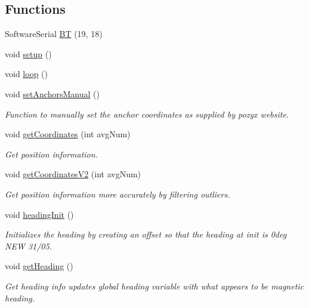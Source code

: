 \subsection*{Functions}
\begin{DoxyCompactItemize}
\item 
Software\+Serial \mbox{\hyperlink{bot_main_8ino_ace551ed442614cda896e7802f3b22163}{BT}} (19, 18)
\item 
void \mbox{\hyperlink{bot_main_8ino_a4fc01d736fe50cf5b977f755b675f11d}{setup}} ()
\item 
void \mbox{\hyperlink{bot_main_8ino_afe461d27b9c48d5921c00d521181f12f}{loop}} ()
\item 
void \mbox{\hyperlink{bot_main_8ino_ad401219e4b701bed928f7caafd7108f2}{set\+Anchors\+Manual}} ()
\begin{DoxyCompactList}\small\item\em Function to manually set the anchor coordinates as supplied by pozyx website. \end{DoxyCompactList}\item 
void \mbox{\hyperlink{bot_main_8ino_a0a52ea394eae088c805441c570ab15bb}{get\+Coordinates}} (int avg\+Num)
\begin{DoxyCompactList}\small\item\em Get position information. \end{DoxyCompactList}\item 
void \mbox{\hyperlink{bot_main_8ino_a71fd924d62ee6af82d3d5cd64004505b}{get\+Coordinates\+V2}} (int avg\+Num)
\begin{DoxyCompactList}\small\item\em Get position information more accurately by filtering outliers. \end{DoxyCompactList}\item 
void \mbox{\hyperlink{bot_main_8ino_a69409a63f3546ae3a73b1dd0b8231c6f}{heading\+Init}} ()
\begin{DoxyCompactList}\small\item\em Initializes the heading by creating an offset so that the heading at init is 0deg N\+EW 31/05. \end{DoxyCompactList}\item 
void \mbox{\hyperlink{bot_main_8ino_a5609bff11340150a4f8ae053b35f2d83}{get\+Heading}} ()
\begin{DoxyCompactList}\small\item\em Get heading info updates global heading variable with what appears to be magnetic heading. \end{DoxyCompactList}\item 

\end{DoxyCompactItemize}
